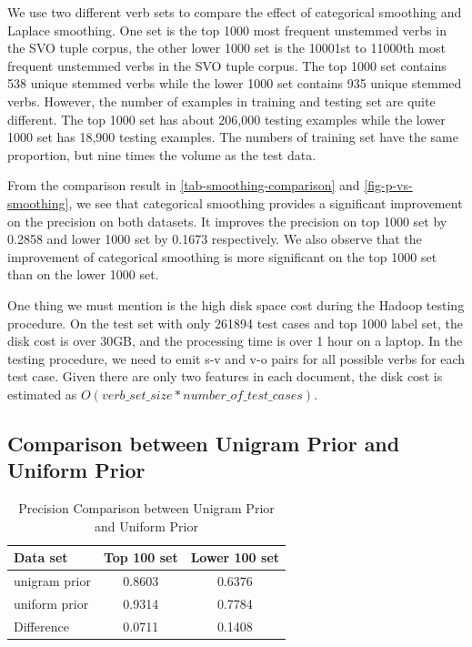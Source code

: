 We use two different verb sets to compare the effect of categorical smoothing and Laplace smoothing. One set is the top 1000 most frequent unstemmed verbs in the SVO tuple corpus, the other lower 1000 set is the 10001st to 11000th most frequent unstemmed verbs in the SVO tuple corpus. The top 1000 set contains 538 unique stemmed verbs while the lower 1000 set contains 935 unique stemmed verbs. However, the number of examples in training and testing set are quite different. The top 1000 set has about 206,000 testing examples while the lower 1000 set has 18,900 testing examples. The numbers of training set have the same proportion, but nine times the volume as the test data.

From the comparison result in \ref{tab-smoothing-comparison} and \ref{fig-p-vs-smoothing}, we see that categorical smoothing provides a significant improvement on the precision on both datasets. It improves the precision on top 1000 set by 0.2858 and lower 1000 set by 0.1673 respectively. We also observe that the improvement of categorical smoothing is more significant on the top 1000 set than on the lower 1000 set.

One thing we must mention is the high disk space cost during the Hadoop testing procedure. On the test set with only 261894 test cases and top 1000 label set, the disk cost is over 30GB, and the processing time is over 1 hour on a laptop. In the testing procedure, we need to emit s-v and v-o pairs for all possible verbs for each test case. Given there are only two features in each document, the disk cost is estimated as $O(verb\_set\_size * number\_of\_test\_cases)$. 

\subsection{Comparison between Unigram Prior and Uniform Prior}

\begin{table}[t]
\caption{Precision Comparison between Unigram Prior and Uniform Prior}
\label{tab-prior-comparison}
\vskip 0.15in
\begin{center}
\begin{small}
\begin{sc}
\begin{tabular}{l|cc}
\hline
\abovespace \belowspace
Data set & Top 100 set & Lower 100 set \\
\hline
\abovespace
unigram prior & 0.8603 & 0.6376 \\
\belowspace
uniform prior & 0.9314 & 0.7784 \\
\hline
\abovespace
\belowspace
Difference & 0.0711 & 0.1408 \\
\hline
\end{tabular}
\end{sc}
\end{small}
\end{center}
\vskip -0.1in
\end{table}

